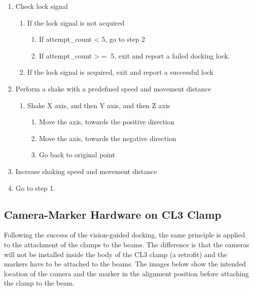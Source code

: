 \begin{enumerate}
	\item Check lock signal

\begin{enumerate}
	\item If the lock signal is not acquired

\begin{enumerate}
	\item If attempt\_count < 5, go to step 2

	\item If attempt\_count >$=$ 5, exit and report a failed docking lock.

\end{enumerate}
	\item If the lock signal is acquired, exit and report a successful lock

\end{enumerate}
	\item Perform a shake with a predefined speed and movement distance

\begin{enumerate}
	\item Shake X axis, and then Y axis, and then Z axis

\begin{enumerate}
	\item Move the axis, towards the positive direction

	\item Move the axis, towards the negative direction

	\item Go back to original point

\end{enumerate}
\end{enumerate}
	\item Increase shaking speed and movement distance

	\item Go to step 1.

\end{enumerate}
\subsection{Camera-Marker Hardware on CL3 Clamp}
\label{subsection:exploration-5-camera-marker-hardware-on-cl3-clamp}

Following the success of the vision-guided docking, the same principle is applied to the attachment of the clamps to the beams. The difference is that the cameras will not be installed inside the body of the CL3 clamp (a retrofit) and the markers have to be attached to the beams. The images below show the intended location of the camera and the marker in the alignment position before attaching the clamp to the beam.

